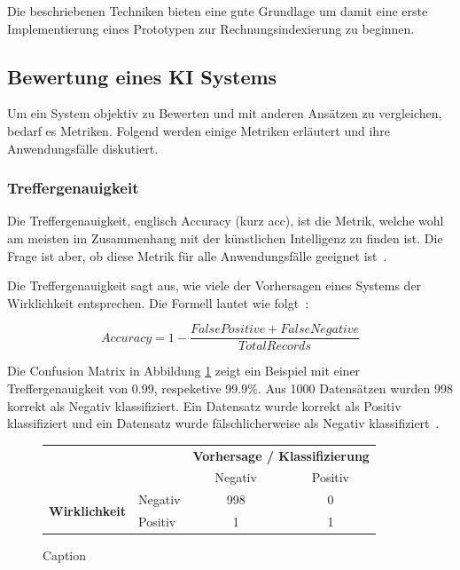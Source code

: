 Die beschriebenen Techniken bieten eine gute Grundlage um damit eine erste Implementierung eines Prototypen zur Rechnungsindexierung zu beginnen.

\subsection{Bewertung eines KI Systems}

Um ein System objektiv zu Bewerten und mit anderen Ansätzen zu vergleichen, bedarf es Metriken. Folgend werden einige Metriken erläutert und ihre Anwendungsfälle diskutiert.

\subsubsection{Treffergenauigkeit}

Die Treffergenauigkeit, englisch Accuracy (kurz acc), ist die Metrik, welche wohl am meisten im Zusammenhang mit der künstlichen Intelligenz zu finden ist. Die Frage ist aber, ob diese Metrik für alle Anwendungsfälle geeignet ist~\autocite{TDSAccuracy}.

Die Treffergenauigkeit sagt aus, wie viele der Vorhersagen eines Systems der Wirklichkeit entsprechen. Die Formell lautet wie folgt~\autocite{TDSAccuracy}: 

$$Accuracy = 1 - \frac{False Positive + False Negative}{Total Records}$$

Die Confusion Matrix in Abbildung \ref{cm-sample} zeigt ein Beispiel mit einer Treffergenauigkeit von 0.99, respeketive 99.9\%. Aus 1000 Datensätzen wurden 998 korrekt als Negativ klassifiziert. Ein Datensatz wurde korrekt als Positiv klassifiziert und ein Datensatz wurde fälschlicherweise als Negativ klassifiziert~\autocite{TDSAccuracy}.

\begin{figure}[h]
    \centering
    \def\arraystretch{1.5}
    \begin{tabular}{llcc}
        \multicolumn{2}{l}{}                                                                       & \multicolumn{2}{c}{\textbf{Vorhersage / Klassifizierung}}   \\ \cline{3-4} 
        \multicolumn{1}{c}{\textbf{}}                               & \multicolumn{1}{l|}{}        & \multicolumn{1}{c|}{Negativ} & \multicolumn{1}{c|}{Positiv} \\ \cline{2-4} 
        \multicolumn{1}{l|}{\multirow{2}{*}{\textbf{Wirklichkeit}}} & \multicolumn{1}{l|}{Negativ} & \multicolumn{1}{c|}{998}    & \multicolumn{1}{c|}{0}       \\ \cline{2-4} 
        \multicolumn{1}{l|}{}                                       & \multicolumn{1}{l|}{Positiv} & \multicolumn{1}{c|}{1}       & \multicolumn{1}{c|}{1}       \\ \cline{2-4} 
    \end{tabular}
    \caption{Caption}
    \label{cm-sample}
\end{figure}

